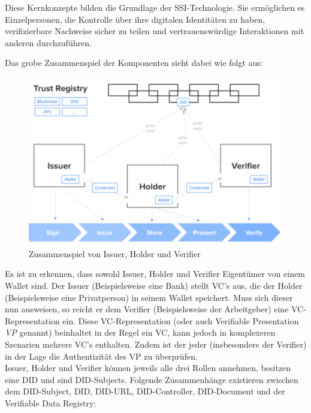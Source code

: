 Diese Kernkonzepte bilden die Grundlage der SSI-Technologie. Sie ermöglichen es Einzelpersonen, die Kontrolle über ihre digitalen Identitäten zu haben, verifizierbare Nachweise sicher zu teilen und vertrauenswürdige Interaktionen mit anderen durchzuführen.

Das grobe Zusammenspiel der Komponenten sieht dabei wie folgt aus:

\begin{figure}[h]
	\centering
	\includegraphics[scale=0.3]{media/zusammenspiel.png}
	\caption{Zusammenspiel von Issuer, Holder und Verifier}
	\label{fig:meine-grafik}
\end{figure}

Es ist zu erkennen, dass sowohl Issuer, Holder und Verifier Eigentümer von einem Wallet sind. Der Issuer (Beispielsweise eine Bank) stellt VC's aus, die der Holder (Beispielsweise eine Privatperson) in seinem Wallet speichert. Muss sich dieser nun ausweisen, so reicht er dem Verifier (Beispielsweise der Arbeitgeber) eine VC-Representation ein. Diese VC-Representation (oder auch Verifiable Presentation \textsl{VP} genannt) beinhaltet in der Regel ein VC, kann jedoch in komplexeren Szenarien mehrere VC's enthalten. Zudem ist der jeder (insbesondere der Verifier) in der Lage die Authentizität des VP zu überprüfen.\\

Issuer, Holder und Verifier können jeweils alle drei Rollen annehmen, besitzen eine DID und sind DID-Subjects. Folgende Zusammenhänge existieren zwischen dem DID-Subject, DID, DID-URL, DID-Controller, DID-Document und der Verifiable Data Registry:

